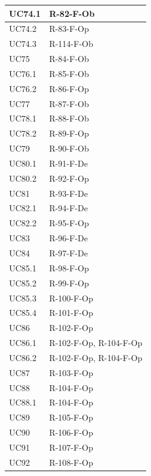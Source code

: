 \documentclass[a4paper, 10pt]{article}
\begin{document}
\begin{longtable}{|p{2.8cm}|p{10cm}|}
        UC74.1 & R-82-F-Ob \\ \hline
        UC74.2 & R-83-F-Op \\ \hline
        UC74.3 & R-114-F-Ob \\ \hline
        UC75 & R-84-F-Ob \\ \hline
        UC76.1 & R-85-F-Ob \\ \hline
        UC76.2 & R-86-F-Op \\ \hline
        UC77 & R-87-F-Ob \\ \hline
        UC78.1 & R-88-F-Ob \\ \hline
        UC78.2 & R-89-F-Op \\ \hline
        UC79 & R-90-F-Ob \\ \hline
        UC80.1 & R-91-F-De \\ \hline
        UC80.2 & R-92-F-Op \\ \hline
        UC81 & R-93-F-De \\ \hline
        UC82.1 & R-94-F-De \\ \hline
        UC82.2 & R-95-F-Op \\ \hline
        UC83 & R-96-F-De \\ \hline
        UC84 & R-97-F-De \\ \hline
        UC85.1 & R-98-F-Op \\ \hline
        UC85.2 & R-99-F-Op \\ \hline
        UC85.3 & R-100-F-Op \\ \hline
        UC85.4 & R-101-F-Op \\ \hline
        UC86 & R-102-F-Op \\ \hline
        UC86.1 & R-102-F-Op, R-104-F-Op \\ \hline
        UC86.2 & R-102-F-Op, R-104-F-Op \\ \hline
        UC87 & R-103-F-Op \\ \hline
        UC88 & R-104-F-Op \\ \hline
        UC88.1 & R-104-F-Op \\ \hline
        UC89 & R-105-F-Op \\ \hline
        UC90 & R-106-F-Op \\ \hline
        UC91 & R-107-F-Op \\ \hline
        UC92 & R-108-F-Op \\ \hline
\end{longtable}
\endgroup
\end{document}
